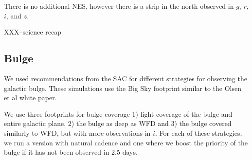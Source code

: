 There is no additional NES, however there is a strip in the north observed in $g$, $r$, $i$, and $z$.


XXX--science recap











\subsection{Bulge}

We used recommendations from the SAC for different strategies for observing the galactic bulge. These simulations use the Big Sky footprint similar to the Olsen et al white paper.  

We use three footprints for bulge coverage 1) light coverage of the bulge and entire galactic plane, 2) the bulge as deep as WFD and 3) the bulge covered similarly to WFD, but with more observations in $i$.  For each of these strategies, we run a version with natural cadence and one where we boost the priority of the bulge if it has not been observed in 2.5 days. 


